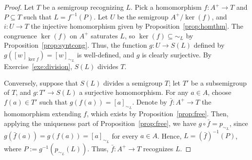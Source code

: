 \begin{proof}
  Let $T$ be a semigroup recognizing $L$. Pick a homomorphism $f \colon A^+ \to T$ and $P \subseteq T$ such that $L = f^{-1}(P)$. Let $U$ be the semigroup $A^+/{\ker(f)}$, and $i \colon U \to T$ the injective homomorphism given by Proposition~\ref{prop:homthm}. The congruence $\ker(f)$ on $A^+$ saturates $L$, so $\ker(f) \subseteq {\sim_L}$ by Proposition~\ref{prop:syntcong}. Thus, the function $g \colon U \to S(L)$ defined by $g([w]_{\ker{f}}) = [w]_{\sim_L}$ is well-defined, and $g$ is clearly surjective. By Exercise~\ref{exe:division}, $S(L)$ divides $T$.
 
  Conversely, suppose that $S(L)$ divides a semigroup $T$; let $T'$ be a subsemigroup of $T$,  and $g \colon T' \to S(L)$ a surjective homomorphism. For any $a \in A$, choose $f(a) \in T'$ such that $g(f(a)) = [a]_{\sim_L}$. Denote by $\bar{f} \colon A^+ \to T$ the homomorphism extending $f$, which exists by Proposition~\ref{prop:free}. Then, applying the uniqueness part of Proposition~\ref{prop:free}, we have $g \circ \bar{f} = p_{\sim_L}$, since $g(\bar{f}(a)) = g(f(a)) = [a]_{\sim_L}$ for every $a \in A$. Hence, $L = (\bar{f})^{-1}(P)$, where $P := g^{-1}(p_{\sim_L}(L))$. Thus, $\bar{f} \colon A^+ \to T$ recognizes $L$.
% 
\end{proof}

